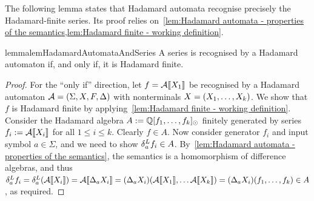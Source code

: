 The following lemma states that Hadamard automata recognise precisely the Hadamard-finite series.
%
Its proof relies on~\cref{lem:Hadamard automata - properties of the semantics,lem:Hadamard finite - working definition}.
%
\begin{restatable}{lemma}{lemHadamardAutomataAndSeries}
    \label{lem:Hadamard automata and series}
    A series is recognised by a Hadamard automaton if, and only if,
    it is Hadamard finite.
\end{restatable}
\begin{proof}
    For the ``only if'' direction, let $f = \mathcal A\llbracket X_1\rrbracket$
    be recognised by a Hadamard automaton $\mathcal A =(\Sigma, X, F, \Delta)$
    with nonterminals $X = (X_1, \dots, X_k)$.
    We show that $f$ is Hadamard finite
    by applying~\cref{lem:Hadamard finite - working definition}.
    Consider the Hadamard algebra $A := \mathbb Q[f_1,\dots, f_k]_{\operatorname{\odot}}$
    finitely generated by series $f_i := \mathcal A\llbracket X_i\rrbracket$ for all $1 \leq i \leq k$.
    Clearly $f \in A$.
    Now consider generator $f_i$ and input symbol $a \in \Sigma$,
    and we need to show $\delta^L_{a} f_i \in A$.
    By~\cref{lem:Hadamard automata - properties of the semantics},
    the semantics is a homomorphism of difference algebras, and thus
    $\delta^L_{a} f_i
        = \delta^L_{a} {(\mathcal A\llbracket X_i\rrbracket)}
        = \mathcal A\llbracket\Delta_a X_i\rrbracket
        = (\Delta_a X_i)(\mathcal A\llbracket X_1\rrbracket, \dots \mathcal A\llbracket X_k\rrbracket)
        = (\Delta_a X_i)(f_1, \dots, f_k) \in A$,
    as required.


\end{proof}
